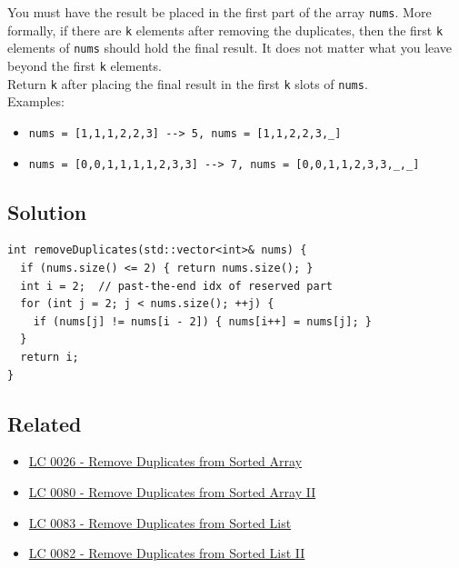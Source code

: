 You must have the result be placed in the first part of the array {\colorbox{CodeBackground}{\lstinline|nums|}}. More formally, if there are {\colorbox{CodeBackground}{\lstinline|k|}} elements after removing the duplicates, then the first {\colorbox{CodeBackground}{\lstinline|k|}} elements of {\colorbox{CodeBackground}{\lstinline|nums|}} should hold the final result. It does not matter what you leave beyond the first {\colorbox{CodeBackground}{\lstinline|k|}} elements.\\

Return {\colorbox{CodeBackground}{\lstinline|k|}} after placing the final result in the first {\colorbox{CodeBackground}{\lstinline|k|}} slots of {\colorbox{CodeBackground}{\lstinline|nums|}}.\\

Examples:
\begin{itemize}
	\item {\colorbox{CodeBackground}{\lstinline|nums = [1,1,1,2,2,3] --> 5, nums = [1,1,2,2,3,_]|}}
	\item {\colorbox{CodeBackground}{\lstinline|nums = [0,0,1,1,1,1,2,3,3] --> 7, nums = [0,0,1,1,2,3,3,_,_]|}}
\end{itemize}

\subsection*{Solution}
\begin{lstlisting}
int removeDuplicates(std::vector<int>& nums) {
  if (nums.size() <= 2) { return nums.size(); }
  int i = 2;  // past-the-end idx of reserved part
  for (int j = 2; j < nums.size(); ++j) {
    if (nums[j] != nums[i - 2]) { nums[i++] = nums[j]; }
  }
  return i;
}
\end{lstlisting}

\subsection*{Related}
\begin{itemize}
	\item \hyperref[lc0026]{LC 0026 - Remove Duplicates from Sorted Array}
	\item \hyperref[lc0080]{LC 0080 - Remove Duplicates from Sorted Array II}
	\item \hyperref[lc0083]{LC 0083 - Remove Duplicates from Sorted List}
	\item \hyperref[lc0082]{LC 0082 - Remove Duplicates from Sorted List II}
\end{itemize}

